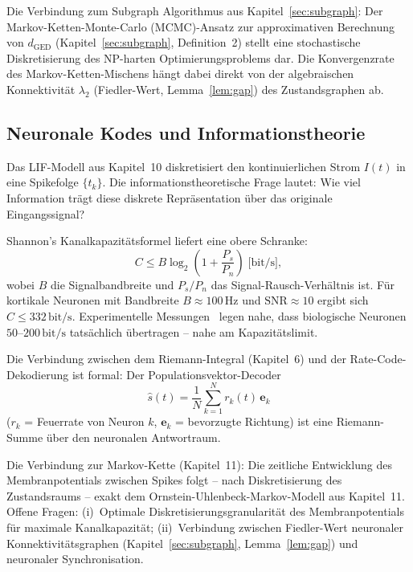 ﻿\documentclass[a4paper,12pt]{article}
\theoremstyle{definition}
\begin{document}
Die Verbindung zum Subgraph Algorithmus aus Kapitel~\ref{sec:subgraph}: Der
Markov-Ketten-Monte-Carlo (MCMC)-Ansatz zur approximativen Berechnung von
$d_{\mathrm{GED}}$ (Kapitel~\ref{sec:subgraph}, Definition~2) stellt eine stochastische
Diskretisierung des NP-harten Optimierungsproblems dar. Die Konvergenzrate des
Markov-Ketten-Mischens hängt dabei direkt von der algebraischen Konnektivität
$\lambda_2$ (Fiedler-Wert, Lemma~\ref{lem:gap}) des Zustandsgraphen ab.

\subsection{Neuronale Kodes und Informationstheorie}

Das LIF-Modell aus Kapitel~10 diskretisiert den kontinuierlichen Strom $I(t)$ in eine
Spikefolge $\{t_k\}$. Die informationstheoretische Frage lautet: Wie viel Information
trägt diese diskrete Repräsentation über das originale Eingangssignal?

Shannon's Kanalkapazitätsformel liefert eine obere Schranke:
\[
C \leq B \log_2\!\left(1 + \frac{P_s}{P_n}\right) \;\text{[bit/s]},
\]
wobei $B$ die Signalbandbreite und $P_s/P_n$ das Signal-Rausch-Verhältnis ist.
Für kortikale Neuronen mit Bandbreite $B \approx 100\,\text{Hz}$ und
$\mathrm{SNR} \approx 10$ ergibt sich $C \leq 332\,\text{bit/s}$.
Experimentelle Messungen~\cite{mainen1995} legen nahe, dass biologische Neuronen
$50$--$200\,\text{bit/s}$ tatsächlich übertragen -- nahe am Kapazitätslimit.

Die Verbindung zwischen dem Riemann-Integral (Kapitel~6) und der Rate-Code-Dekodierung
ist formal: Der Populationsvektor-Decoder
\[
\hat{s}(t) = \frac{1}{N}\sum_{k=1}^N r_k(t)\,\mathbf{e}_k
\]
($r_k$ = Feuerrate von Neuron $k$, $\mathbf{e}_k$ = bevorzugte Richtung)
ist eine Riemann-Summe über den neuronalen Antwortraum.

Die Verbindung zur Markov-Kette (Kapitel~11): Die zeitliche Entwicklung des Membranpotentials
zwischen Spikes folgt -- nach Diskretisierung des Zustandsraums -- exakt dem
Ornstein-Uhlenbeck-Markov-Modell aus Kapitel~11.
Offene Fragen: (i)~Optimale Diskretisierungsgranularität des Membranpotentials für
maximale Kanalkapazität; (ii)~Verbindung zwischen Fiedler-Wert neuronaler
Konnektivitätsgraphen (Kapitel~\ref{sec:subgraph}, Lemma~\ref{lem:gap}) und neuronaler
Synchronisation.
\end{document}
